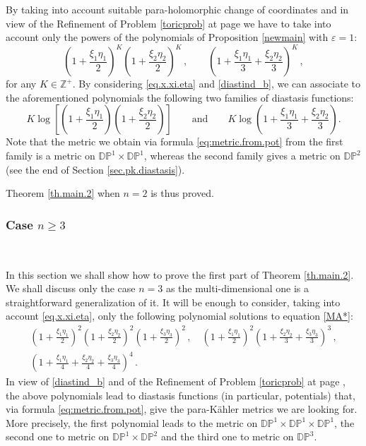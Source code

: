 \documentclass[11pt, reqno]{amsart}
\newcommand{\Z}{\mathds{Z}}
\newcommand{\DP}{\mathds{D}\mathds{P}}
\newcommand{\e}{\varepsilon}
\newcommand{\pk }{para-K\"{a}hler }
\begin{document}
By taking into account suitable para-holomorphic change of coordinates and in view of the Refinement  of Problem \ref{toricprob} at page \pageref{Refi}
we have to take into account only the powers of the polynomials of Proposition \ref{newmain} with $\e=1$:
$$\left( 1+\frac{\xi_1\eta_1}{2}\right)^K\left( 1+ \frac{\xi_2\eta_2}{2}\right)^K\,,\qquad \left( 1+ \frac{\xi_1\eta_1}{3} + \frac{\xi_2\eta_2}{3}\right)^K\,,$$
for any $K\in\Z^+$.
By considering \eqref{eq.x.xi.eta} and \eqref{diastind_b}, we can associate to the aforementioned polynomials the following two families of diastasis functions:
$$K\log\left[\left( 1+\frac{\xi_1\eta_1}{2}\right)\left( 1+ \frac{\xi_2\eta_2}{2}\right)\right]\qquad\text{and}\qquad K\log\left( 1+ \frac{\xi_1\eta_1}{3} + \frac{\xi_2\eta_2}{3}\right).$$
Note that the metric we obtain via formula \eqref{eq:metric.from.pot} from the first family is a metric on $\DP^1\times \DP^1$, whereas the second family gives a metric on $\DP^2$ (see the end of Section \ref{sec.pk.diastasis}). 

\medskip\noindent
Theorem \ref{th.main.2} when $n=2$ is thus proved. 

\subsubsection{\textbf{Case $n\geq 3$}}\label{sec.n3} 

\

\noindent
In this section we shall show how to prove the first part of Theorem \ref{th.main.2}. We shall discuss only the case $n=3$ as the multi-dimensional one is a straightforward generalization of it. It will be enough to consider, taking into account \eqref{eq.x.xi.eta}, only the following polynomial solutions to  equation \eqref{MA*}:
\begin{multline}
\left( 1+\frac{\xi_1\eta_1}{2}\right)^2\left( 1+ \frac{\xi_2\eta_2}{2}\right)^2\left( 1+ \frac{\xi_3\eta_3}{2}\right)^2\,,\quad \left( 1+\frac{\xi_1\eta_1}{2}\right)^2 \left( 1+ \frac{\xi_2\eta_2}{3} + \frac{\xi_3\eta_3}{3}\right)^3\,, 
\\
\left( 1+\frac{\xi_1\eta_1}{4}+ \frac{\xi_2\eta_2}{4} + \frac{\xi_3\eta_3}{4}\right)^4\,.
\end{multline}
In view of \eqref{diastind_b} and of  the Refinement  of Problem \ref{toricprob} at page \pageref{Refi}, the above polynomials lead to diastasis functions (in particular, potentials) that, via formula \eqref{eq:metric.from.pot}, give the \pk metrics we are looking for. More precisely, the first polynomial leads to the metric on $\DP^1\times\DP^1\times\DP^1$, the second one to metric on $\DP^1\times\DP^2$ and the third one to metric on $\DP^3$.
\end{document}
